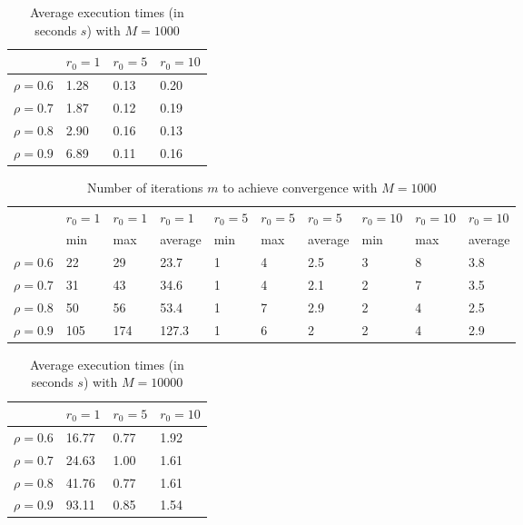 \documentclass[a4paper,11pt,openright]{report}
\begin{document}
\begin{table}[H]
\centering
\addtolength{\leftskip}{-1.5cm}
\addtolength{\rightskip}{-1.5cm}
\begin{tabular}{|c|lll|}
\hline
$ $ & $r_0 = 1$ & $r_0 = 5$ & $r_0 = 10$ \\
\hline
$\rho = 0.6$ & 1.28 & 0.13 & 0.20 \\

$\rho = 0.7$ & 1.87 & 0.12 & 0.19 \\

$\rho = 0.8$ & 2.90 & 0.16 & 0.13 \\

$\rho = 0.9$ & 6.89 & 0.11 & 0.16 \\
\hline
\end{tabular}
\caption{Average execution
 times (in seconds $s$) with $M = 1000$}
\end{table}
\begin{table}[H]
\centering
\addtolength{\leftskip}{-1.5cm}
\addtolength{\rightskip}{-1.5cm}
\begin{tabular}{|c|lllllllll|}
\hline
$ $ & $r_0 = 1$ & $r_0 = 1$ & $r_0 = 1$ & $r_0 = 5$ & $r_0 = 5$ & $r_0 = 5$ & $r_0 = 10$ & $r_0 = 10$ & $r_0 = 10$  \\
$ $ & min & max & average & min & max & average & min & max & average \\ 
\hline
$\rho = 0.6$ & 22 & 29 & 23.7 & 1 & 4 & 2.5 & 3 & 8 & 3.8\\

$\rho = 0.7$ & 31 & 43 & 34.6 & 1 & 4 & 2.1 & 2 & 7 & 3.5\\

$\rho = 0.8$ & 50 & 56 & 53.4 & 1 & 7 & 2.9 & 2 & 4 & 2.5\\

$\rho = 0.9$ & 105 & 174 & 127.3 & 1 & 6 & 2 & 2 & 4 & 2.9\\
\hline
\end{tabular}
\caption{Number of iterations $m$ to achieve convergence with $M = 1000$}
\end{table}
\begin{table}[H]
\centering
\addtolength{\leftskip}{-1.5cm}
\addtolength{\rightskip}{-1.5cm}
\begin{tabular}{|c|lll|}
\hline
$ $ & $r_0 = 1$ & $r_0 = 5$ & $r_0 = 10$ \\
\hline
$\rho = 0.6$ & 16.77 & 0.77 & 1.92 \\

$\rho = 0.7$ & 24.63 & 1.00 & 1.61 \\

$\rho = 0.8$ & 41.76 & 0.77 & 1.61 \\

$\rho = 0.9$ & 93.11 & 0.85 & 1.54 \\
\hline
\end{tabular}
\caption{Average execution
 times (in seconds $s$) with $M = 10000$}
\end{table}
\end{document}
